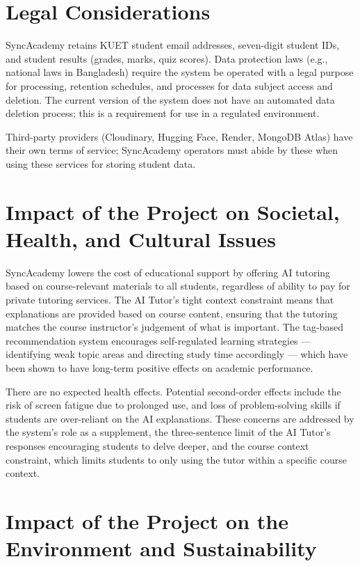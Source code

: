 \documentclass[12pt,a4paper]{report}
\begin{document}
\section{Legal Considerations}

SyncAcademy retains KUET student email addresses, seven-digit student IDs, and student results (grades, marks, quiz scores). Data protection laws (e.g., national laws in Bangladesh) require the system be operated with a legal purpose for processing, retention schedules, and processes for data subject access and deletion. The current version of the system does not have an automated data deletion process; this is a requirement for use in a regulated environment.

Third-party providers (Cloudinary, Hugging Face, Render, MongoDB Atlas) have their own terms of service; SyncAcademy operators must abide by these when using these services for storing student data.

\section{Impact of the Project on Societal, Health, and Cultural Issues}

SyncAcademy lowers the cost of educational support by offering AI tutoring based on course-relevant materials to all students, regardless of ability to pay for private tutoring services. The AI Tutor's tight context constraint means that explanations are provided based on course content, ensuring that the tutoring matches the course instructor's judgement of what is important. The tag-based recommendation system encourages self-regulated learning strategies --- identifying weak topic areas and directing study time accordingly --- which have been shown to have long-term positive effects on academic performance.

There are no expected health effects. Potential second-order effects include the risk of screen fatigue due to prolonged use, and loss of problem-solving skills if students are over-reliant on the AI explanations. These concerns are addressed by the system's role as a supplement, the three-sentence limit of the AI Tutor's responses encouraging students to delve deeper, and the course context constraint, which limits students to only using the tutor within a specific course context.

\section{Impact of the Project on the Environment and Sustainability}
\end{document}
